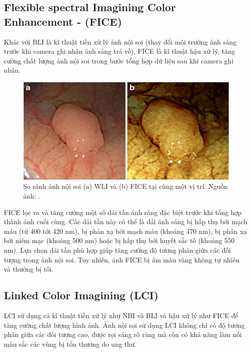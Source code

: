 \documentclass[12pt]{extreport}
\begin{document}
\subsection{Flexible spectral Imagining Color Enhancement - (FICE)}

Khác với BLI là kĩ thuật tiền xử lý ảnh nội soi (thay đổi môi trường ánh sáng trước khi camera ghi nhận ánh sáng trả về), FICE là kĩ thuật hậu xử lý, tăng cường chất lượng ảnh nội soi trong bước tổng hợp dữ liệu sau khi camera ghi nhận.

\begin{figure}[H]
    \centering
    \includegraphics[width=0.9\linewidth]{figure20.png}
    \caption{So sánh ảnh nội soi (a) WLI và (b) FICE tại cùng một vị trí. Nguồn ảnh: \cite{s0038401113808}.}
\end{figure}

FICE lọc ra và tăng cường một số dải tần ánh sáng đặc biệt trước khi tổng hợp thành ảnh cuối cùng. Các dải tần này có thể là dải ánh sáng bị hấp thụ bởi mạch máu (từ 400 tới 420 nm), bị phản xạ bởi mạch máu (khoảng 470 nm), bị phản xạ bởi niêm mạc (khoảng 500 nm) hoặc bị hấp thụ bởi huyết sắc tố (khoảng 550 nm). Lựa chọn dải tần phù hợp giúp tăng cường độ tương phản giữa các đối tượng trong ảnh nội soi. Tuy nhiên, ảnh FICE bị ám màu vàng không tự nhiên và thường bị tối.

\subsection{Linked Color Imagining (LCI)}
\label{lci}

LCI sử dụng cả kĩ thuật tiền xử lý như NBI và BLI và hậu xử lý như FICE để tăng cường chất lượng hình ảnh. Ảnh nội soi sử dụng LCI không chỉ có độ tương phản giữa các đối tượng cao, được rọi sáng rõ ràng mà còn có khả năng làm nổi màu sắc các vùng bị tổn thương do ung thư.
\end{document}
